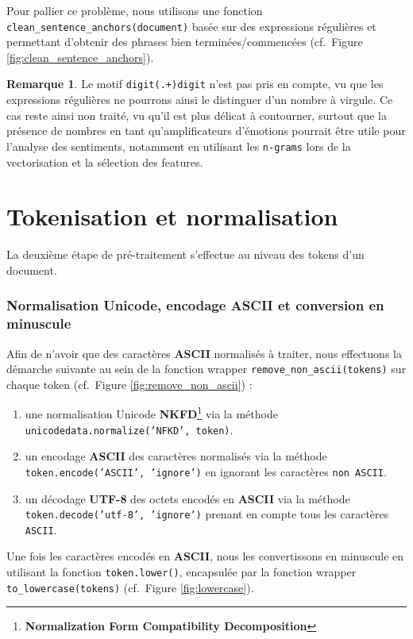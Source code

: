 \documentclass[12pt,a4paper]{report}
\theoremstyle{definition}
\newtheorem*{remark}{Remarque}
\begin{document}
\noindent Pour pallier ce problème, nous utilisons une fonction \texttt{clean\_sentence\_anchors(document)} basée sur des expressions régulières et permettant d'obtenir des phrases bien terminées/commencées (cf.~Figure \ref{fig:clean_sentence_anchors}).

\begin{remark}
  Le motif \texttt{digit(.+)digit} n'est pas pris en compte, vu que les expressions régulières ne pourrons ainsi le distinguer d'un nombre à virgule. Ce cas reste ainsi non traité, vu qu'il est plus délicat à contourner, surtout que la présence de nombres en tant qu'amplificateurs d'émotions pourrait être utile pour l'analyse des sentiments, notamment en utilisant les \texttt{n-grams} lors de la vectorisation et la sélection des features.
\end{remark}

\section{Tokenisation et normalisation}
La deuxième étape de pré-traitement s'effectue au niveau des tokens d'un document.

\subsubsection{Normalisation Unicode, encodage ASCII et conversion en minuscule}
Afin de n'avoir que des caractères \textbf{ASCII} normalisés à traiter, nous effectuons la démarche suivante au sein de la fonction wrapper \texttt{remove\_non\_ascii(tokens)} sur chaque token (cf.~Figure \ref{fig:remove_non_ascii}) :
\begin{enumerate}
  \item une normalisation Unicode \textbf{NKFD}\footnote{\textbf{Normalization Form Compatibility Decomposition}} via la méthode \texttt{unicodedata.normalize('NFKD', token)}.
  \item un encodage \textbf{ASCII} des caractères normalisés via la méthode \texttt{token.encode('ASCII', 'ignore')} en ignorant les caractères \texttt{non ASCII}.
  \item un décodage \textbf{UTF-8} des octets encodés en \textbf{ASCII} via la méthode \texttt{token.decode('utf-8', 'ignore')} prenant en compte tous les caractères \texttt{ASCII}.
\end{enumerate}

Une fois les caractères encodés en \textbf{ASCII}, nous les convertissons en minuscule en utilisant la fonction \texttt{token.lower()}, encapsulée par la fonction wrapper \texttt{to\_lowercase(tokens)} (cf.~Figure \ref{fig:lowercase}).
\end{document}
